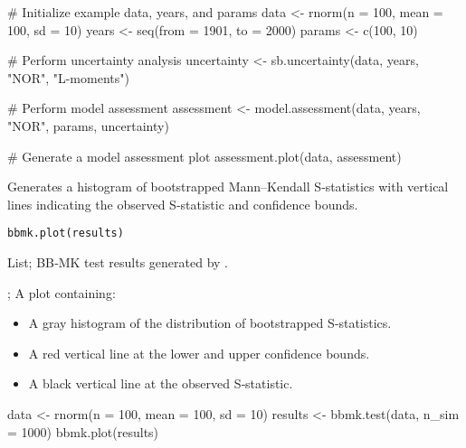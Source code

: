 \documentclass[a4paper]{book}
\begin{document}
%
\begin{Examples}
\begin{ExampleCode}
# Initialize example data, years, and params
data <- rnorm(n = 100, mean = 100, sd = 10)
years <- seq(from = 1901, to = 2000)
params <- c(100, 10)

# Perform uncertainty analysis
uncertainty <- sb.uncertainty(data, years, "NOR", "L-moments")

# Perform model assessment
assessment <- model.assessment(data, years, "NOR", params, uncertainty)

# Generate a model assessment plot
assessment.plot(data, assessment)

\end{ExampleCode}
\end{Examples}
%
\begin{Description}
Generates a histogram of bootstrapped Mann–Kendall S‐statistics with vertical
lines indicating the observed S‐statistic and confidence bounds.
\end{Description}
%
\begin{Usage}
\begin{verbatim}
bbmk.plot(results)
\end{verbatim}
\end{Usage}
%
\begin{Arguments}
\begin{ldescription}
\item[\code{results}] List; BB‐MK test results generated by .
\end{ldescription}
\end{Arguments}
%
\begin{Value}
; A plot containing:
\begin{itemize}

\item{} A gray histogram of the distribution of bootstrapped S‐statistics.
\item{} A red vertical line at the lower and upper confidence bounds.
\item{} A black vertical line at the observed S‐statistic.

\end{itemize}

\end{Value}
%
\begin{Examples}
\begin{ExampleCode}
data <- rnorm(n = 100, mean = 100, sd = 10)
results <- bbmk.test(data, n_sim = 1000)
bbmk.plot(results)

\end{ExampleCode}
\end{Examples}
\end{document}
